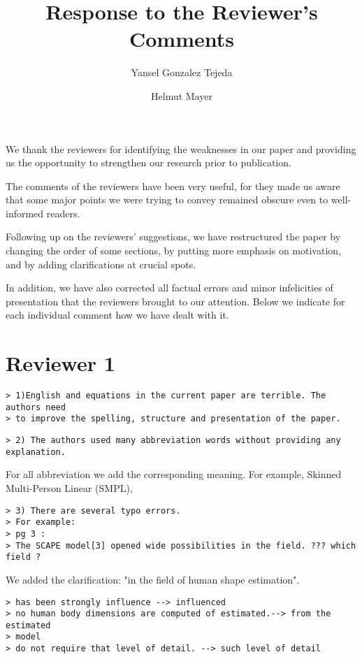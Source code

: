 \documentclass{article}
\title{Response to the Reviewer's Comments}
\author{Yansel Gonzalez Tejeda \and	Helmut Mayer}
\begin{document}
\maketitle

We thank the reviewers for identifying the weaknesses in our paper and 
providing us the opportunity to strengthen our research prior to publication.

The comments of the reviewers have been very useful, for they
made us aware that some major points we were trying to convey
remained obscure even to well-informed readers.

Following up
on the reviewers' suggestions, we have restructured the paper
by changing the order of some sections, by putting more emphasis
on motivation, and by adding clarifications at crucial spots.

In addition, we have also corrected all factual errors and
minor infelicities of presentation that the reviewers brought
to our attention. Below we indicate for each individual comment
how we have dealt with it.

\section*{Reviewer 1}
\begin{verbatim}
> 1)English and equations in the current paper are terrible. The authors need
> to improve the spelling, structure and presentation of the paper.
\end{verbatim}

\begin{verbatim}
> 2) The authors used many abbreviation words without providing any explanation.
\end{verbatim}

For all abbreviation we add the corresponding meaning. For example, Skinned 
Multi-Person Linear (SMPL), 

\begin{verbatim}
> 3) There are several typo errors.
> For example:
> pg 3 :
> The SCAPE model[3] opened wide possibilities in the field. ??? which field ?
\end{verbatim}

We added the clarification: "in the field of human shape estimation".

\begin{verbatim}
> has been strongly influence --> influenced
> no human body dimensions are computed of estimated.--> from the estimated
> model
> do not require that level of detail. --> such level of detail
\end{verbatim}
\end{document}
